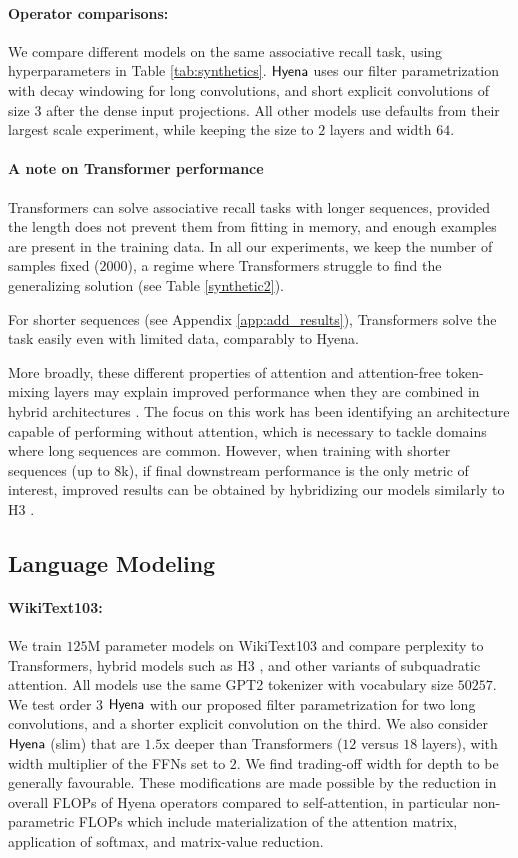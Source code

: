 \paragraph{Operator comparisons:}
%
We compare different models on the same associative recall task, using hyperparameters in Table \ref{tab:synthetics}. ${\sf Hyena}$ uses our filter parametrization with decay windowing for long convolutions, and short explicit convolutions of size $3$ after the dense input projections. All other models use defaults from their largest scale experiment, while keeping the size to $2$ layers and width $64$.

\paragraph{A note on Transformer performance}
%
Transformers can solve associative recall tasks with longer sequences, provided the length does not prevent them from fitting in memory, and enough examples are present in the training data. In all our experiments, we keep the number of samples fixed ($2000$), a regime where Transformers struggle to find the generalizing solution (see Table \ref{synthetic2}).

For shorter sequences (see Appendix \ref{app:add_results}), Transformers solve the task easily even with limited data, comparably to {\sf Hyena}. 

More broadly, these different properties of attention and attention-free token-mixing layers may explain improved performance when they are combined in hybrid architectures \citep{dao2022hungry}. The focus on this work has been identifying an architecture capable of performing without attention, which is necessary to tackle domains where long sequences are common. However, when training with shorter sequences (up to $8$k), if final downstream performance is the only metric of interest, improved results can be obtained by hybridizing our models similarly to H3 \citep{dao2022hungry}.


%
\subsection{Language Modeling}
%
\paragraph{WikiText103:}
%
We train $125$M parameter models on {\sc WikiText103} and compare perplexity to Transformers, hybrid models such as H3 \citep{dao2022hungry}, and other variants of subquadratic attention. All models use the same GPT2 tokenizer with vocabulary size $50257$. We test order $3$ ${\sf Hyena}$ with our proposed filter parametrization for two long convolutions, and a shorter explicit convolution on the third. We also consider ${\sf Hyena}$ (slim) that are $1.5$x deeper than Transformers ($12$ versus $18$ layers), with width multiplier of the FFNs set to $2$. We find trading-off width for depth to be generally favourable. These modifications are made possible by the reduction in overall FLOPs of {\sf Hyena} operators compared to self-attention, in particular non-parametric FLOPs which include materialization of the attention matrix, application of softmax, and matrix-value reduction. 

